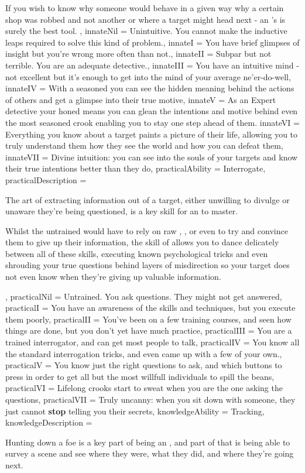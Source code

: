 {If you wish to know why someone would behave in a given way\comma{} why a certain shop was robbed and not another\comma{} or where a target might head next - an \name{}'s \imp{\innateAbility} is surely the best tool.
,
innateNil = Unintuitive. You cannot make the inductive leaps required to solve this kind of problem.,
innateI = You have brief glimpses of insight\comma{} but you're wrong more often than not.,
innateII = Subpar\comma{} but not terrible. You are an adequate detective.,
innateIII = You have an intuitive mind - not excellent\comma{} but it's enough to get into the mind of your average ne'er-do-well,
innateIV = With a seasoned you can see the hidden meaning behind the actions of others and get a glimpse into their true motive,
innateV =  As an Expert detective your honed  means you can glean the intentions and motive behind even the most seasoned crook\comma{} enabling you to stay one step ahead of them. 
innateVI = Everything you know about a target paints a picture of their life, allowing you to truly understand them\comma{} how they see the world and how you can defeat them,
innateVII = Divine intuition: you can see into the souls of your targets and know their true intentions better than they do,
practicalAbility = Interrogate,
practicalDescription = {The art of extracting information out of a target, either unwilling to divulge or unaware they're being questioned, is a key skill for an \imp{\name} to master. 

Whilst the untrained would have to rely on raw , ,  or even  to try and convince them to give up their information, the skill of  allows you to dance delicately between all of these skills, executing known psychological tricks and even shrouding your true questions behind layers of misdirection so your target does not even know when they're giving up valuable information.},
practicalNil = {Untrained. You ask questions. They might not get answered},
practicalI = {You have an awareness of the skills and techniques, but you execute them poorly},
practicalII = {You've been on a few training courses, and seen how things are done, but you don't yet have much practice},
practicalIII = {You are a trained interrogator, and can get most people to talk},
practicalIV = {You know all the standard interrogation tricks, and even came up with a few of your own.},
practicalV = {You know just the right questions to ask, and which buttons to press in order to get all but the most willfull individuals to spill the beans},
practicalVI = {Lifelong crooks start to sweat when you are the one asking the questions},
practicalVII = {Truly uncanny: when you sit down with someone, they just cannot {\bf stop} telling you their secrets},
knowledgeAbility = Tracking,
knowledgeDescription = {Hunting down a foe is a key part of being an \imp{\name}, and part of that is being able to survey a scene and see where they were, what they did, and where they're going next.

}}
